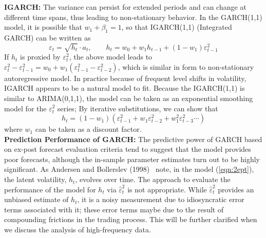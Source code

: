 \noindent\textbf{IGARCH:} The variance can persist for extended periods and can change at different time spans, thus leading to non-stationary behavior. In the GARCH(1,1) model, it is possible that $w_1 + \beta_1 = 1$, so that IGARCH(1,1) (Integrated GARCH) can be written as
	\begin{equation}\label{eqn:2eptsqrt}
	\varepsilon_t = \sqrt{h_t} \cdot a_t,\qquad h_t = w_0 + w_1h_{t-1} + (1 - w_1)\varepsilon_{t-1}^2
	\end{equation}
If $h_t$ is proxied by $\varepsilon_t^2$, the above model leads to $\varepsilon_t^2 - \varepsilon_{t-1}^2 = w_0 + w_1(\varepsilon_{t-1}^2 - \varepsilon_{t-2}^2)$, which is similar in form to non-stationary autoregressive model. In practice because of frequent level shifts in volatility, IGARCH appears to be a natural model to fit. Because the IGARCH(1,1) is similar to ARIMA(0,1,1), the model can be taken as an exponential smoothing model for the $\varepsilon_t^2$ series; By iterative substitutions, we can show that
	\begin{equation}\label{eqn:2ht1w}
	h_t = (1 - w_1)(\varepsilon_{t-1}^2 + w_1\varepsilon_{t-2}^2 + w_1^2\varepsilon_{t-3}^2 \cdots)
	\end{equation}
where $w_1$ can be taken as a discount factor. \\


\noindent\textbf{Prediction Performance of GARCH:} The predictive power of GARCH based on ex-post forecast evaluation criteria tend to suggest that the model provides poor forecasts, although the in-sample parameter estimates turn out to be highly significant. As Andersen and Bollerslev (1998)~\cite{andersen1998} note, in the model (\ref{eqn:2ept}), the latent volatility, $h_t$, evolves over time. The approach to evaluate the performance of the model for $h_t$ via $\hat{\varepsilon}_t^2$ is not appropriate. While $\hat{\varepsilon}_t^2$ provides an unbiased estimate of $h_t$, it is a noisy measurement due to idiosyncratic error terms associated with it; these error terms maybe due to the result of compounding frictions in the trading process. This will be further clarified when we discuss the analysis of high-frequency data. \\


